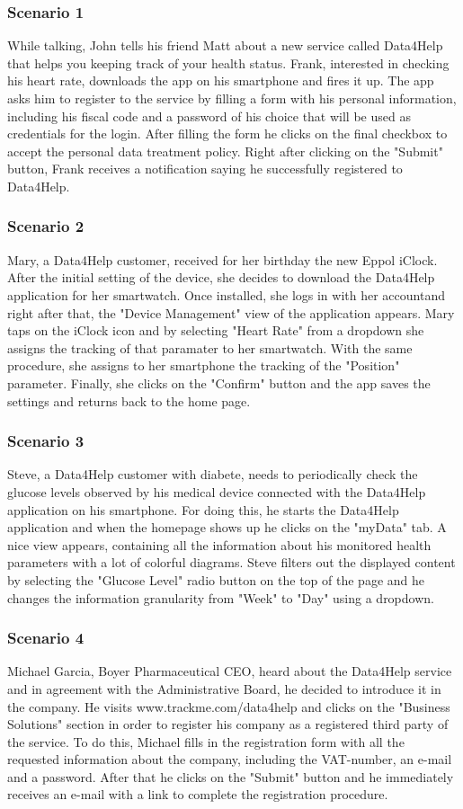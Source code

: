 \subsubsection{Scenario 1}
While talking, John tells his friend Matt about a new service called Data4Help that helps you keeping track of your health status. Frank, interested in checking his heart rate, downloads the app on his smartphone and fires it up. The app asks him to register to the service by filling a form with his personal information, including his fiscal code and a password of his choice that will be used as credentials for the login. 
After filling the form he clicks on the final checkbox to accept the personal data treatment policy.
Right after clicking on the "Submit" button, Frank receives a notification saying he successfully registered to Data4Help.
\subsubsection{Scenario 2}
Mary, a Data4Help customer, received for her birthday the new Eppol iClock. After the initial setting of the device, she decides to download the Data4Help application for her smartwatch. Once installed, she logs in with her accountand right after that, the "Device Management"
 view of the application appears. Mary taps on the iClock icon and by selecting "Heart Rate" from a dropdown she assigns the tracking of that paramater to her smartwatch. With the same procedure, she assigns to her smartphone the tracking of the "Position" parameter.
Finally, she clicks on the "Confirm" button and the app saves the settings and returns back to the home page.
\subsubsection{Scenario 3}
Steve, a Data4Help customer with diabete, needs to periodically check the glucose levels observed by his medical device connected with the Data4Help application on his smartphone. For doing this, he starts the Data4Help application and when the homepage shows up he  clicks on the "myData" tab. A nice view appears, containing all the information about his monitored health parameters with a lot of colorful diagrams. Steve filters out the displayed content by selecting the "Glucose Level" radio button on the top of the page and he changes the information granularity from "Week" to "Day" using a dropdown.  
\subsubsection{Scenario 4}
Michael Garcia, Boyer Pharmaceutical CEO, heard about the Data4Help service and in agreement with the Administrative Board, he decided to introduce it in the company. He visits  www.trackme.com/data4help and clicks on the "Business Solutions" section in order to register his company as a registered third party of the service. To do this, Michael fills in the registration form with all the requested information about the company, including the VAT-number, an e-mail and a password. After that he clicks on the "Submit" button and he immediately receives an e-mail with a link to complete the registration procedure.
